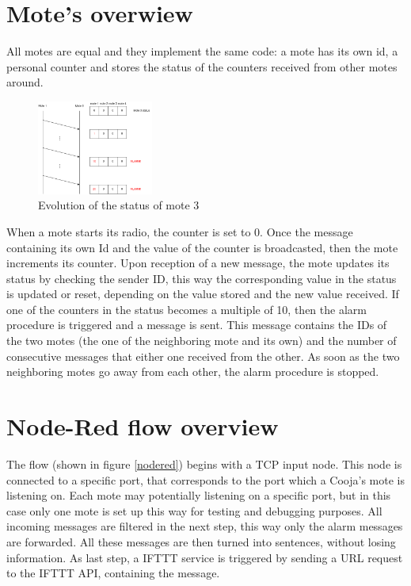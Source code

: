 \documentclass[11pt]{article}
\begin{document}
\section{Mote's overwiew}
All motes are equal and they implement the same code: \newline
a mote has its own id, a personal counter and stores the status of the counters received from other motes around. \newline
\begin{figure}
  \begin{center}
    \includegraphics[width=0.34\textwidth]{status_update_diagram.png}
    \caption{Evolution of the status of mote 3}
  \end{center}
\end{figure}
When a mote starts its radio, the counter is set to 0. Once the message containing its own Id and the value of the counter is broadcasted, then the mote increments its counter. \newline
Upon reception of a new message, the mote updates its status by checking the sender ID, this way the corresponding value in the status is updated or reset, depending on the value stored and the new value received. \newline
If one of the counters in the status becomes a multiple of 10, then the alarm procedure is triggered and a message is sent. This message contains the IDs of the two motes (the one of the neighboring mote and its own) and the number of consecutive messages that either one received from the other. \newline
As soon as the two neighboring motes go away from each other, the alarm procedure is stopped.

\section{Node-Red flow overview}
The flow (shown in figure \ref{nodered}) begins with a TCP input node. This node is connected to a specific port, that corresponds to the port which a Cooja's mote is listening on. Each mote may potentially listening on a specific port, but in this case only one mote is set up this way for testing and debugging purposes. \newline
All incoming messages are filtered in the next step, this way only the alarm messages are forwarded. All these messages are then turned into sentences, without losing information. \newline
As last step, a IFTTT service is triggered by sending a URL request to the IFTTT API, containing the message. \newline
\end{document}
